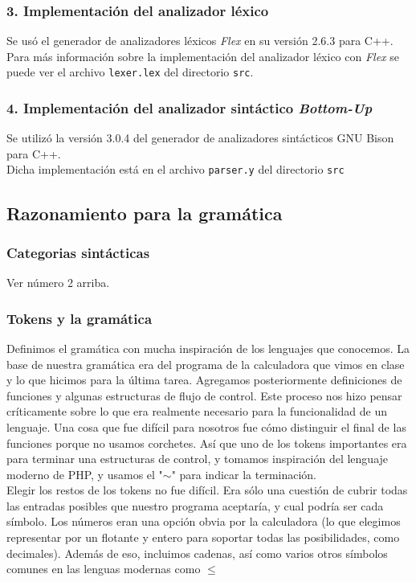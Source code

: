\documentclass[12pt]{article}
\begin{document}
\subsubsection*{3. Implementación del analizador léxico}
Se usó el generador de analizadores léxicos \textit{Flex} en su versión 2.6.3 para C++. \\
Para más información sobre la implementación del analizador léxico con \textit{Flex} se puede ver el archivo \texttt{lexer.lex} del directorio \texttt{src}.\\
\subsubsection*{4. Implementación del analizador sintáctico \textit{Bottom-Up}}
Se utilizó la versión 3.0.4 del generador de analizadores sintácticos GNU Bison para C++. \\
Dicha implementación está en el archivo \texttt{parser.y} del directorio \texttt{src}


\subsection*{Razonamiento para la gramática}
\subsubsection*{Categorias sintácticas}
Ver número 2 arriba.
\subsubsection*{Tokens y la gramática}
Definimos el gramática con mucha inspiración de los lenguajes que conocemos. La base de nuestra gramática era del programa de la calculadora que vimos en clase y lo que hicimos para la última tarea. Agregamos posteriormente definiciones de funciones y algunas estructuras de flujo de control. Este proceso nos hizo pensar críticamente sobre lo que era realmente necesario para la funcionalidad de un lenguaje. Una cosa que fue difícil para nosotros fue cómo distinguir el final de las funciones porque no usamos corchetes. Así que uno de los tokens importantes era para terminar una estructuras de control, y tomamos inspiración del lenguaje moderno de PHP, y usamos el "$\sim$" para indicar la terminación. \\

Elegir los restos de los tokens no fue difícil. Era sólo una cuestión de cubrir todas las entradas posibles que nuestro programa aceptaría, y cual podría ser cada símbolo. Los números eran una opción obvia por la calculadora (lo que elegimos representar por un flotante y entero para soportar todas las posibilidades, como decimales). Además de eso, incluimos cadenas, así como varios otros símbolos comunes en las lenguas modernas como $\leq$
\end{document}
